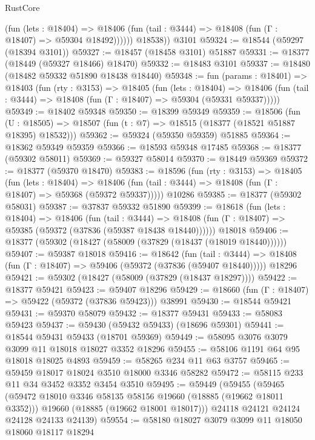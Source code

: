 \begin{lexlean}{RustCore}
\begin{coremodule}
              (fun (lets : @18404) =>
              @18406 (fun (tail : @3444) => @18408 (fun (Γ : @18407) => @59304 @18492))))))
        @18538))
    @3101
@59324 := @18544 (@59297 (@18394 @3101))
@59327 := @18457 (@18458 @3101) @51887
@59331 := @18377 (@18449 (@59327 @18466) @18470)
@59332 := @18483 @3101
@59337 := @18480 (@18482 @59332 @51890 @18438 @18440)
@59348 := fun (params : @18401) =>
  @18403
    (fun (rty : @3153) =>
    @18405
      (fun (lets : @18404) =>
      @18406 (fun (tail : @3444) => @18408 (fun (Γ : @18407) => @59304 (@59331 @59337)))))
@59349 := @18402 @59348
@59350 := @18399 @59349
@59359 := @18506
    (fun (U : @18505) => @18507 (fun (t : @7) => @18515 (@18377 (@18521 @51887 @18395) @18532)))
@59362 := @59324 (@59350 @59359) @51885
@59364 := @18362 @59349 @59359
@59366 := @18593 @59348 @17485
@59368 := @18377 (@59302 @58011)
@59369 := @59327 @58014
@59370 := @18449 @59369
@59372 := @18377 (@59370 @18470)
@59383 := @18596
    (fun (rty : @3153) =>
    @18405
      (fun (lets : @18404) =>
      @18406 (fun (tail : @3444) => @18408 (fun (Γ : @18407) => @59368 (@59372 @59337)))))
    @10286
@59385 := @18377 (@59302 @58031)
@59387 := @37837 @59332 @51890
@59399 := @18618
    (fun (lets : @18404) =>
    @18406
      (fun (tail : @3444) =>
      @18408 (fun (Γ : @18407) => @59385 (@59372 (@37836 (@59387 @18438 @18440))))))
    @18018
@59406 := @18377 (@59302 (@18427 (@58009 (@37829 (@18437 (@18019 @18440))))))
@59407 := @59387 @18018
@59416 := @18642
    (fun (tail : @3444) => @18408 (fun (Γ : @18407) => @59406 (@59372 (@37836 (@59407 @18440)))))
    @18296
@59421 := @59302 (@18427 (@58009 (@37829 (@18437 @18297))))
@59422 := @18377 @59421
@59423 := @59407 @18296
@59429 := @18660 (fun (Γ : @18407) => @59422 (@59372 (@37836 @59423))) @38991
@59430 := @18544 @59421
@59431 := @59370 @58079
@59432 := @18377 @59431
@59433 := @58083 @59423
@59437 := @59430 (@59432 @59433) (@18696 @59301)
@59441 := @18544 @59431 @59433 (@18701 @59369)
@59449 := @58095 @3076 @3079 @3099 @11 @18018 @18027 @3352 @18296
@59455 := @58106 @1191 @64 @95 @18018 @18025 @4893
@59459 := @58265 @234 @11 @63 @3757
@59465 := @59459 @18017 @18024 @3510 @18000 @3346 @58282
@59472 := @58115 @233 @11 @34 @3452 @3352 @3454 @3510
@59495 := @59449
    (@59455
      (@59465
        (@59472 @18010 @3346 @58135 @58156 @19660 (@18885 (@19662 @18011 @3352)))
        @19660
        (@18885 (@19662 @18001 @18017)))
      @24118
      @24121
      @24124
      @24128
      @24133
      @24139)
@59554 := @58180
    @18027
    @3079
    @3099
    @11
    @18050
    @18060
    @18117
    @18294

\end{coremodule}
\end{lexlean}
